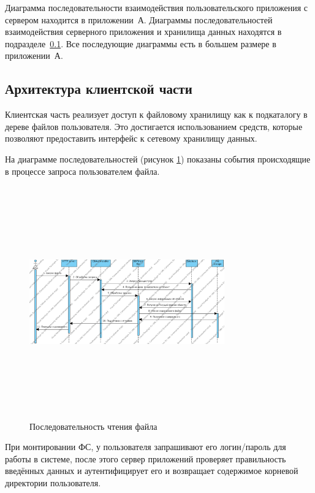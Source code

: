 \documentclass[utf8,usehyperref,12pt]{G7-32}
\begin{document}
Диаграмма последовательности взаимодействия пользовательского приложения с сервером находится в приложении~А. Диаграммы последовательностей взаимодействия серверного приложения и хранилища данных находятся в подразделе~\ref{ssect:client_arch}. Все последующие диаграммы есть в большем размере в приложении~А.
 
\subsection{Архитектура клиентской части}\label{ssect:client_arch}

Клиентская часть реализует доступ к файловому хранилищу как к подкаталогу в дереве файлов пользователя. Это достигается использованием средств, которые позволяют предоставить интерфейс к сетевому хранилищу данных.

На диаграмме последовательностей (рисунок \ref{fig:get_sequence}) показаны события происходящие в процессе запроса пользователем файла. 

\begin{figure}[ht]
   \centering%
   \includegraphics[height=100mm, width=0.75\textwidth, clip, keepaspectratio]{pictures/get_seq}
   \caption{Последовательность чтения файла}\label{fig:get_sequence}
 \end{figure}

При монтировании ФС, у пользователя запрашивают его логин/пароль для работы в системе, после этого сервер приложений проверяет правильность введённых данных и аутентифицирует его и возвращает содержимое корневой директории пользователя.
\end{document}
